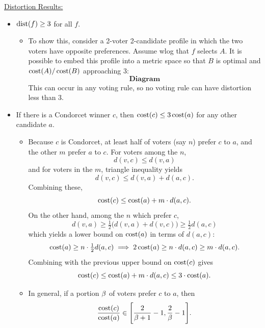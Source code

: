 \documentclass{amsart}
\DeclareMathOperator{\cost}{\rm{cost}}
\DeclareMathOperator{\dist}{\rm{dist}}
\begin{document}
\underline{Distortion Results:}
\begin{itemize}
	\item $\dist(f)\geq 3$ for all $f$.
	\begin{itemize}
		\item To show this, consider a 2-voter 2-candidate profile in which the two voters have opposite preferences. Assume wlog that $f$ selects $A$. It is possible to embed this profile into a metric space so that $B$ is optimal and $\cost(A)/\cost(B)$ approaching 3:
		$$
		\textbf{Diagram}
		$$
		This can occur in any voting rule, so no voting rule can have distortion less than 3.
	\end{itemize}
	\item If there is a Condorcet winner $c$, then $\cost(c)\leq 3\cost(a)$ for any other candidate $a$.
	\begin{itemize}
		\item Because $c$ is Condorcet, at least half of voters (say $n$) prefer $c$ to $a$, and the other $m$ prefer $a$ to $c$. For voters among the $n$, 
		$$
		d(v,c) \leq d(v,a)
		$$
		and for voters in the $m$, triangle inequality yields 
		$$
		d(v,c) \leq d(v,a) + d(a,c).
		$$
		Combining these,
		$$
			\cost(c) \leq \cost(a) + m \cdot d(a,c).
		$$
		On the other hand, among the $n$ which prefer $c$, 
		$$
		d(v,a) \geq \tfrac12 \big(d(v,a) + d(v,c)\big) \geq \tfrac12 d(a,c) 
		$$
		which yields a lower bound on $\cost(a)$ in terms of $d(a,c)$:
		$$\cost(a) \geq n \cdot \tfrac12 d(a,c) \implies 2\cost(a) \geq n\cdot d(a,c) \geq m\cdot d(a,c).$$
		Combining with the previous upper bound on $\cost(c)$ gives
		$$
		\cost(c) \leq \cost(a) + m\cdot d(a,c) \leq 3\cdot \cost(a).
		$$
		\item In general, if a portion $\beta$ of voters prefer $c$ to $a$, then 
		$$
		\frac{\cost(c)}{\cost(a)} \in \Bigg[\frac{2}{\b+1} - 1,\frac{2}{\b}-1\Bigg].
		$$ 
		

\end{itemize}
\end{itemize}
\end{document}
